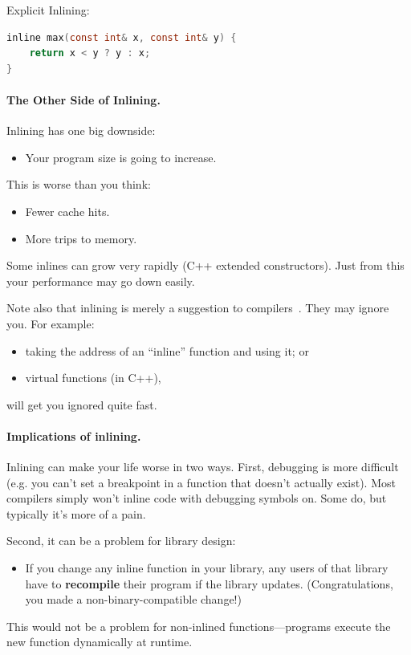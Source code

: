 \documentclass[a4paper]{report}
\begin{document}
Explicit Inlining:
  \begin{lstlisting}[language=C]
inline max(const int& x, const int& y) {
    return x < y ? y : x;
}
  \end{lstlisting}

\paragraph{The Other Side of Inlining.}
Inlining has one big downside:
  \begin{itemize}
    \item Your program size is going to increase.
  \end{itemize}
   This is worse than you think:
      \begin{itemize}
        \item Fewer cache hits.
        \item More trips to memory.
      \end{itemize}
   Some inlines can grow very rapidly (C++ extended constructors).
  Just from this your performance may go down easily.

  Note also that inlining is merely a suggestion to compilers~\cite{gcc:inlining}.
  They may ignore you.
  For example:
  \begin{itemize}
    \item taking the address of an ``inline'' function and using it; or
    \item virtual functions (in C++),
  \end{itemize}
  will get you ignored quite fast.

\paragraph{Implications of inlining.} Inlining can make your life worse in two ways.
First, debugging is more difficult (e.g. you can't set a breakpoint in a function that
  doesn't actually exist).
 Most compilers simply won't inline code with debugging symbols on.
 Some do, but typically it's more of a pain.

Second, it can be a problem for library design:
  \begin{itemize}
    \item If you change any inline function in your library, any users
      of that library have to {\bf recompile} their program if the
      library updates. (Congratulations, you made a non-binary-compatible change!)
  \end{itemize}
This would not be a problem for non-inlined functions---programs execute the new function
dynamically at runtime.
\end{document}
